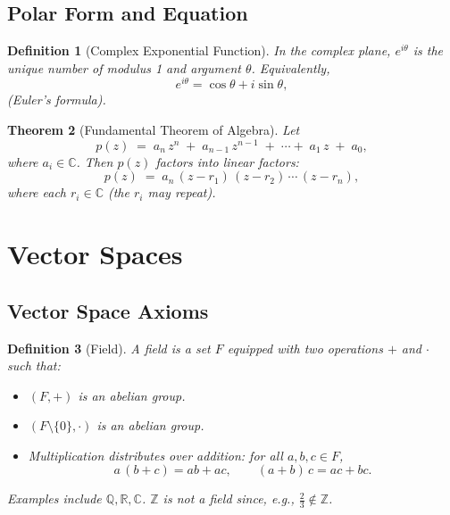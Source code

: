 \documentclass[12pt]{article}
\theoremstyle{break}             %
\newtheorem{thm}{Theorem}          %
\newtheorem{defn}[thm]{Definition}
\begin{document}
\subsection{Polar Form and Equation}

\begin{defn}[Complex Exponential Function]
In the complex plane, \(e^{i\theta}\) is the unique number of modulus 1 and argument \(\theta\).  Equivalently,
\[
e^{i\theta} = \cos\theta + i\sin\theta,
\]
(Euler’s formula).
\end{defn}

\begin{thm}[Fundamental Theorem of Algebra]
Let 
\[
p(z) \;=\; a_n\,z^n \;+\; a_{n-1}\,z^{n-1} \;+\;\cdots+\; a_1\,z \;+\; a_0,
\]
where \(a_i \in \mathbb{C}\). Then \(p(z)\) factors into linear factors:
\[
p(z) \;=\; a_n \,(z - r_1)\,(z - r_2)\,\cdots\,(z - r_n),
\]
where each \(r_i \in \mathbb{C}\) (the \(r_i\) may repeat).
\end{thm}

\section{Vector Spaces}

\subsection{Vector Space Axioms}

\begin{defn}[Field]
A \emph{field} is a set \(F\) equipped with two operations \(+\) and \(\cdot\) such that:
\begin{itemize}
  \item \((F,+)\) is an abelian group.
  \item \((F\setminus\{0\},\cdot)\) is an abelian group.
  \item Multiplication distributes over addition: for all \(a,b,c\in F\),
    \[
      a\,(b+c)=ab+ac,
      \qquad
      (a+b)\,c=ac+bc.
    \]
\end{itemize}
Examples include \(\mathbb{Q},\mathbb{R},\mathbb{C}\).  \(\mathbb{Z}\) is \emph{not} a field since, e.g., \(\tfrac23\notin\mathbb{Z}\).
\end{defn}
\end{document}
